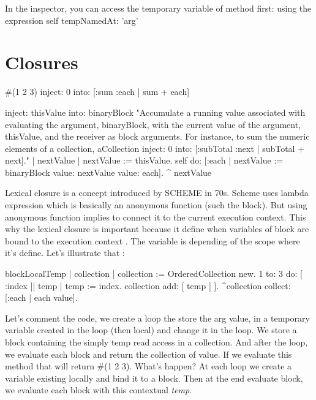\documentclass[a4paper,10pt,twoside]{book}
\begin{document}
In the inspector, you can access the temporary variable of method first: using the expression self tempNamedAt: 'arg'









\section{Closures}


\begin{code}{}
#(1 2 3) inject: 0 into: [:sum :each | sum + each]
\end{code}

\begin{code}{}
inject: thisValue into: binaryBlock
	"Accumulate a running value associated with evaluating the argument,
	binaryBlock, with the current value of the argument, thisValue, and the
	receiver as block arguments. For instance, to sum the numeric elements of a
	collection, aCollection inject: 0 into: [:subTotal :next | subTotal + next]."
	| nextValue |
	nextValue := thisValue.
	self do: [:each | nextValue := binaryBlock value: nextValue value: each]. 	^ nextValue
\end{code}



Lexical closure is a concept introduced by SCHEME in 70s. Scheme uses lambda expression which is basically an anonymous function (such the block). But using anonymous function implies to connect it to the current execution context. This  why the lexical closure is important because it define when variables of block are bound to the execution context . The variable is depending of the scope where it's  define. Let's illustrate that :

\begin{code}{}
blockLocalTemp
	| collection |
		collection := OrderedCollection new.
		1 to: 3 do: [ :index || temp |
			temp := index.
			collection add: [ temp ] ].
		^collection collect: [:each | each value].
\end{code}

Let's comment the code, we create a loop the store the arg value, in a temporary variable created in the loop (then local) and change it in the loop. We store a block containing the simply temp read access in a collection. And after the loop, we evaluate each block and return the collection of value.
If we evaluate this method that will return \#(1 2 3). What's happen? At each loop we create a variable existing locally and bind it to a block. Then at the end evaluate block, we evaluate each block with this contextual \emph{temp}.
\end{document}
